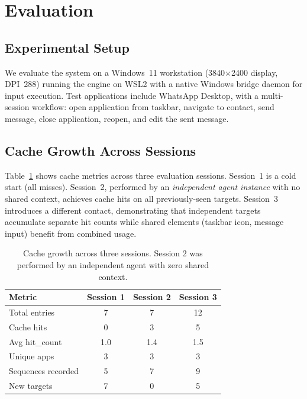 \documentclass[conference]{IEEEtran}
\begin{document}
\section{Evaluation}

\subsection{Experimental Setup}

We evaluate the system on a Windows~11 workstation (3840$\times$2400 display, DPI~288) running the engine on WSL2 with a native Windows bridge daemon for input execution. Test applications include WhatsApp Desktop, with a multi-session workflow: open application from taskbar, navigate to contact, send message, close application, reopen, and edit the sent message.

\subsection{Cache Growth Across Sessions}

Table~\ref{tab:cache_growth} shows cache metrics across three evaluation sessions. Session~1 is a cold start (all misses). Session~2, performed by an \emph{independent agent instance} with no shared context, achieves cache hits on all previously-seen targets. Session~3 introduces a different contact, demonstrating that independent targets accumulate separate hit counts while shared elements (taskbar icon, message input) benefit from combined usage.

\begin{table}[t]
\centering
\caption{Cache growth across three sessions. Session 2 was performed by an independent agent with zero shared context.}
\label{tab:cache_growth}
\small
\begin{tabular}{@{}lccc@{}}
\toprule
\textbf{Metric} & \textbf{Session 1} & \textbf{Session 2} & \textbf{Session 3} \\
\midrule
Total entries      & 7  & 7  & 12 \\
Cache hits         & 0  & 3  & 5  \\
Avg hit\_count     & 1.0 & 1.4 & 1.5 \\
Unique apps        & 3  & 3  & 3  \\
Sequences recorded & 5  & 7  & 9  \\
New targets        & 7  & 0  & 5  \\
\bottomrule
\end{tabular}
\end{table}
\end{document}
